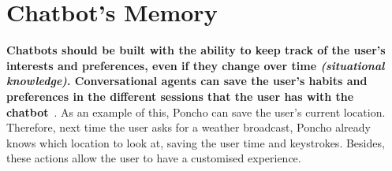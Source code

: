 \documentclass[a4paper,10pt]{article}
\begin{document}


\section{Chatbot's Memory}

\textbf{Chatbots should be built with the ability to keep track of the user's interests and preferences, even if they change over time \textit{(situational knowledge)}. Conversational agents can save the user's habits and preferences in the different sessions that the user has with the chatbot}~\cite{shneiderman1997direct}. As an example of this, Poncho can save the user's current location. Therefore, next time the user asks for a weather broadcast, Poncho already knows which location to look at, saving the user time and keystrokes. Besides, these actions allow the user to have a customised experience. 

\end{document}
